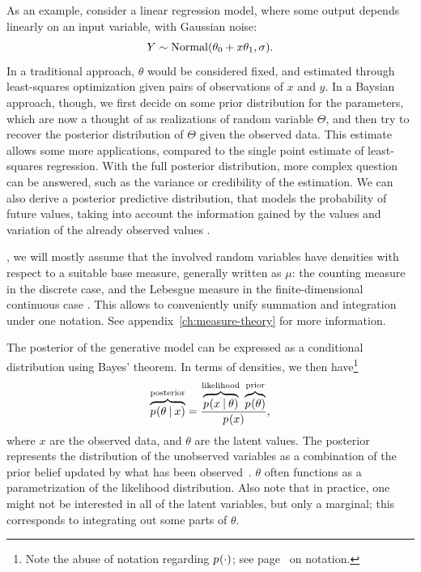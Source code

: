 As an example, consider a linear regression model, where some output depends linearly on an input
variable, with Gaussian noise:
\begin{equation}
  \label{eq:bayes-regression-model}
  Y \sim \mathrm{Normal}(\theta_0 + x\theta_1, \sigma). 
\end{equation}
In a traditional approach, \(\theta\) would be considered fixed, and estimated through least-squares
optimization given pairs of observations of \(x\) and \(y\).  In a Baysian approach, though, we
first decide on some prior distribution for the parameters, which are now a thought of as
realizations of random variable \(\Theta\), and then try to recover the posterior distribution of
\(\Theta\) given the observed data.  This estimate allows some more applications, compared to the
single point estimate of least-squares regression.  With the full posterior distribution, more
complex question can be answered, such as the variance or credibility of the estimation.  We can
also derive a posterior predictive distribution, that models the probability of future values,
taking into account the information gained by the values and variation of the already observed
values \parencite{marin2007bayesian}.

, we will mostly assume that the involved random variables have
densities with respect to a suitable base measure, generally written as \(\mu\): the counting
measure in the discrete case, and the Lebesgue measure in the finite-dimensional continuous case
\parencite{kallenberg2006foundations}.  This allows to conveniently unify summation and integration
under one notation.  See appendix~\ref{ch:measure-theory} for more information.

The posterior of the generative model can be expressed as a conditional distribution using Bayes'
theorem. In terms of densities, we then have\footnote{Note the abuse of notation regarding
  \(\prob{\cdot}\); see page~\pageref{cha:notation} on notation.}
\begin{equation}
  \label{eq:bayes}
  \overbrace{\prob{\theta \given x}}^{\text{posterior}} =
  \frac{\overbrace{\prob{x \given \theta}}^{\text{likelihood}}\;
    \overbrace{\prob{\theta}}^{\text{prior}}}{\prob{x}},
\end{equation}
where \(x\) are the observed data, and \(\theta\) are the latent values. The posterior represents
the distribution of the unobserved variables as a combination of the prior belief updated by what
has been observed~\parencite{congdon2006bayesian}.  \(\theta\) often functions as a parametrization
of the likelihood distribution.  Also note that in practice, one might not be interested in all of
the latent variables, but only a marginal; this corresponds to integrating out some parts of
\(\theta\).

